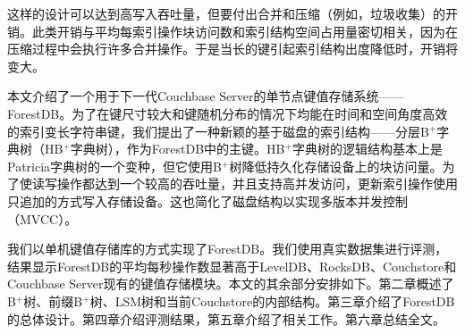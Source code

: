 这样的设计可以达到高写入吞吐量，但要付出合并和压缩（例如，垃圾收集）的开销。此类开销与平均每索引操作块访问数和索引结构空间占用量密切相关，因为在压缩过程中会执行许多合并操作。于是当长的键引起索引结构出度降低时，开销将变大。

本文介绍了一个用于下一代Couchbase Server的单节点键值存储系统——ForestDB。为了在键尺寸较大和键随机分布的情况下均能在时间和空间角度高效的索引变长字符串键，我们提出了一种新颖的基于磁盘的索引结构——分层B$^+$字典树（HB$^+$字典树），作为ForestDB中的主键。HB$^+$字典树的逻辑结构基本上是Patricia字典树的一个变种，但它使用B$^+$树降低持久化存储设备上的块访问量。为了使读写操作都达到一个较高的吞吐量，并且支持高并发访问，更新索引操作使用只追加的方式写入存储设备。这也简化了磁盘结构以实现多版本并发控制（MVCC）。

我们以单机键值存储库的方式实现了ForestDB。我们使用真实数据集进行评测，结果显示ForestDB的平均每秒操作数显著高于LevelDB、RocksDB、Couchstore和Couchbase Server现有的键值存储模块。本文的其余部分安排如下。第二章概述了B$^+$树、前缀B$^+$树、LSM树和当前Couchstore的内部结构。第三章介绍了ForestDB的总体设计。第四章介绍评测结果，第五章介绍了相关工作。第六章总结全文。